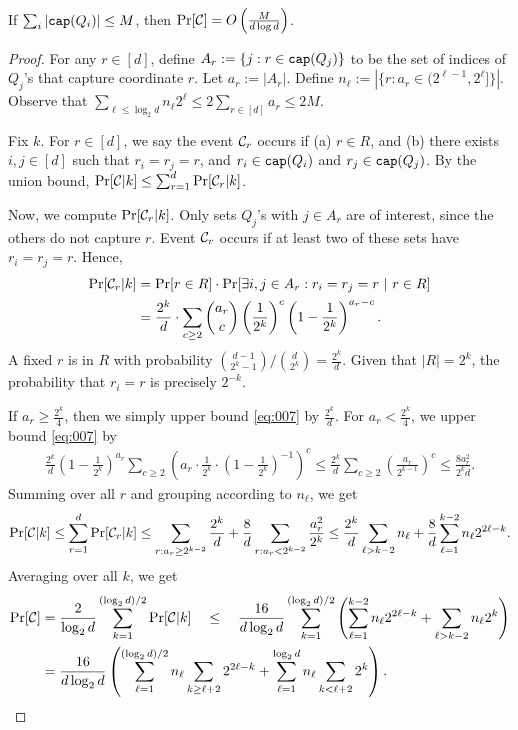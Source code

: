 \begin{lemma}\label{lem:prob}
If $\sum_i |\mathtt{cap}(Q_i)| \leq M$, then $\Pr[{\cal C}] = O\left(\frac{M}{d\log d}\right)$.
\end{lemma}

\begin{proof} 
	For any $r \in [d]$, 
	define $A_r := \{j: r\in \mathtt{cap}(Q_j)\}$ to be the set of indices of $Q_j$'s that capture coordinate $r$.
    Let $a_r := |A_r|$. Define $n_\ell := |\{r: a_r \in (2^{\ell-1},2^{\ell}]\}|$.
	Observe that $\sum_{\ell \leq \log_2 d} n_\ell 2^\ell \leq 2\sum_{r\in [d]} a_r \leq 2M$.
	
	Fix $k$. For $r\in [d]$, we say the event ${\cal C}_r$ occurs if
	(a) $r \in R$, and (b) there exists $i,j\in [d]$ such that $r_i = r_j = r$, and $r_i \in \mathtt{cap}(Q_i)$ and $r_j\in \mathtt{cap}(Q_j)$. By the union
    bound, $\Pr[{\cal C}| k] \leq \sum_{r=1}^d \Pr[{\cal C}_r | k]$.
	
	Now, we compute $\Pr[{\cal C}_r|k]$. 
	Only sets $Q_j$'s with $j \in A_r$ are of interest, since the others do not capture $r$.
	Event ${\cal C}_r$ occurs if at least two of these sets have $r_i = r_j = r$. Hence,
\begin{align}
\Pr[{\cal C}_r|k] & = \Pr[r\in R]\cdot \Pr[\exists i,j\in A_r: r_i = r_j = r ~|~r\in R] \notag \\
& = \frac{2^{k}}{d}\cdot \sum_{c \geq 2} {a_r \choose c} \left(\frac{1}{2^k} \right)^c \left(1-\frac{1}{2^k} \right)^{a_r-c}. \label{eq:007}
\end{align}
A fixed $r$ is in $R$ with probability ${d-1 \choose 2^k-1}/{d\choose 2^k} = \frac{2^k}{d}$.
Given that $|R| = 2^k$, the probability that $r_i = r$ is precisely $2^{-k}$.

	If $a_r \geq \frac{2^k}{4}$, then we simply upper bound \eqref{eq:007} by  $\frac{2^k}{d}$. 
	For $a_r < \frac{2^k}{4}$, %
	we upper bound \eqref{eq:007} by
\begin{align*}
	\frac{2^k}{d} \left(1-\frac{1}{2^k}\right)^{a_r} \sum_{c\geq 2} \left( a_r \cdot \frac{1}{2^k} \cdot \left( 1-\frac{1}{2^k} \right)^{-1} \right)^c \leq \frac{2^k}{d} \sum_{c \geq 2} \left( \frac{a_r}{2^{k-1}} \right)^c \leq \frac{8a^2_r}{2^k d}.
\end{align*}
Summing over all $r$ and grouping according
to $n_\ell$, we get
\begin{align*}
\Pr[{\cal C}|k] \leq \sum_{r=1}^d \Pr[{\cal C}_r|k] 
\leq \sum_{r: a_r \geq 2^{k-2}} \frac{2^k}{d} + \frac{8}{d} \sum_{r: a_r < 2^{k-2}} \frac{a^2_r}{2^k} 
\leq \frac{2^k}{d} \sum_{\ell > k-2} n_\ell + \frac{8}{d}  \sum_{\ell=1}^{k-2} n_\ell 2^{2\ell - k} .
\end{align*}
Averaging over all $k$, we get
\begin{align}
	\Pr[{\cal C}] & = \frac{2}{\log_2 d} \sum_{k=1}^{(\log_2 d)/2}\Pr[{\cal C} | k]   \quad \leq \quad \frac{16}{d \log_2 d} \sum_{k=1}^{(\log_2 d)/2} \left( \sum_{\ell=1}^{k-2} n_\ell 2^{2\ell - k} + \sum_{\ell > k-2} n_\ell 2^k \right) \notag \\
	& = \frac{16}{d\log_2 d} \left(\sum_{\ell=1}^{(\log_2 d)/2} n_\ell \sum_{k \geq \ell + 2} 2^{2\ell - k} + \sum_{\ell=1}^{\log_2 d} n_\ell \sum_{k < \ell+2} 2^k  \right).\label{eq:008}
\end{align}


\end{proof}
